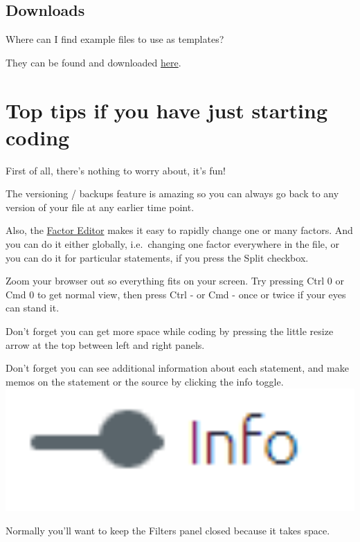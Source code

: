 \documentclass[
]{book}
\begin{document}
\hypertarget{downloads}{%
\section{Downloads}\label{downloads}}

Where can I find example files to use as templates?

They can be found and downloaded \href{https://drive.google.com/drive/folders/1wvifDQ0BXmAjSudTRUv9i_4JURpphD4v}{here}.

\hypertarget{top-tips}{%
\chapter{Top tips if you have just starting coding}\label{top-tips}}

First of all, there's nothing to worry about, it's fun!

The versioning / backups feature is amazing so you can always go back to any version of your file at any earlier time point.

Also, the \protect\hyperlink{factor-editor}{Factor Editor} makes it easy to rapidly change one or many factors. And you can do it either globally, i.e.~changing one factor everywhere in the file, or you can do it for particular statements, if you press the Split checkbox.

Zoom your browser out so everything fits on your screen. Try pressing Ctrl 0 or Cmd 0 to get normal view, then press Ctrl - or Cmd - once or twice if your eyes can stand it.

Don't forget you can get more space while coding by pressing the little resize arrow at the top between left and right panels.

Don't forget you can see additional information about each statement, and make memos on the statement or the source by clicking the info toggle. \includegraphics[width=6.77083in,height=\textheight]{_assets/image-20211220153222953.png}

Normally you'll want to keep the Filters panel closed because it takes space.
\end{document}
